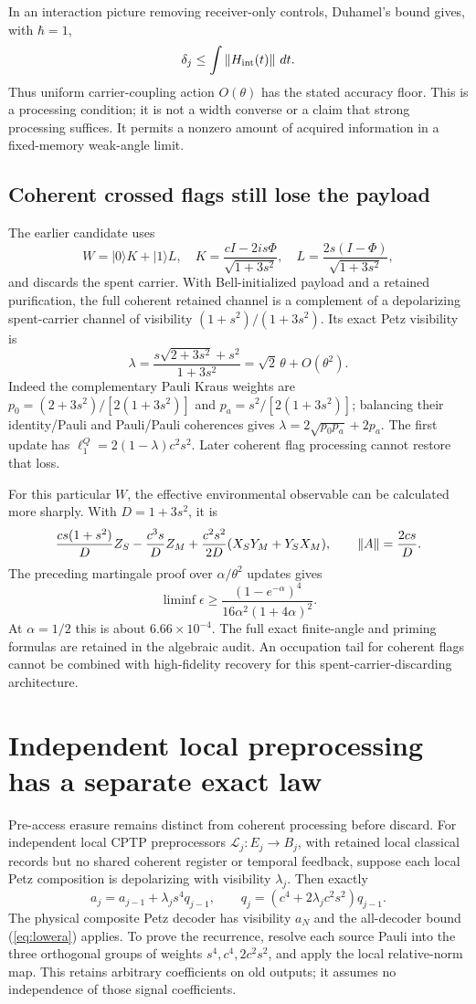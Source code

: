 In an interaction picture removing receiver-only controls, Duhamel's bound
gives, with $\hbar=1$,
\[
 \delta_j\le\int\left\lVert H_{\rm int}(t)\right\rVert\,dt.
\]
Thus uniform carrier-coupling action $O(\theta)$ has the stated accuracy
floor. This is a processing condition; it is not a width converse or a claim
that strong processing suffices. It permits a nonzero amount of acquired
information in a fixed-memory weak-angle limit.

\subsection{Coherent crossed flags still lose the payload}
The earlier candidate uses
\[
 W=|0\rangle K+|1\rangle L,\quad
 K=\frac{cI-2is\Phi}{\sqrt{1+3s^2}},\quad
 L=\frac{2s(I-\Phi)}{\sqrt{1+3s^2}},
\]
and discards the spent carrier. With Bell-initialized payload and a retained
purification, the full coherent retained channel is a complement of a
depolarizing spent-carrier channel of visibility $(1+s^2)/(1+3s^2)$.
Its exact Petz visibility is
\[
 \lambda=\frac{s\sqrt{2+3s^2}+s^2}{1+3s^2}
 =\sqrt2\,\theta+O(\theta^2).
\]
Indeed the complementary Pauli Kraus weights are
$p_0=(2+3s^2)/[2(1+3s^2)]$ and $p_a=s^2/[2(1+3s^2)]$; balancing their
identity/Pauli and Pauli/Pauli coherences gives
$\lambda=2\sqrt{p_0p_a}+2p_a$. The first update has
$\ell_1^Q=2(1-\lambda)c^2s^2$. Later coherent flag processing cannot restore
that loss.

For this particular $W$, the effective environmental observable can be
calculated more sharply. With $D=1+3s^2$, it is
\[
 \frac{cs(1+s^2)}D Z_S-\frac{c^3s}D Z_M
 +\frac{c^2s^2}{2D}(X_SY_M+Y_SX_M),
 \qquad\left\lVert A\right\rVert=\frac{2cs}D.
\]
The preceding martingale proof over $\alpha/\theta^2$ updates gives
\[
 \liminf\epsilon\ge
 \frac{(1-e^{-\alpha})^4}{16\alpha^2(1+4\alpha)^2}.
\]
At $\alpha=1/2$ this is about $6.66\times10^{-4}$. The full exact
finite-angle and priming formulas are retained in the algebraic audit.
An occupation tail for coherent flags cannot be combined with high-fidelity
recovery for this spent-carrier-discarding architecture.

\section{Independent local preprocessing has a separate exact law}
Pre-access erasure remains distinct from coherent processing before discard.
For independent local CPTP preprocessors $\mathcal L_j:E_j\to B_j$, with
retained local classical records but no shared coherent register or temporal
feedback, suppose each local Petz composition is depolarizing with visibility
$\lambda_j$. Then exactly
\[
 a_j=a_{j-1}+\lambda_js^4q_{j-1},\qquad
 q_j=(c^4+2\lambda_jc^2s^2)q_{j-1}.
\]
The physical composite Petz decoder has visibility $a_N$ and the all-decoder
bound (\ref{eq:lowera}) applies. To prove the recurrence, resolve each source
Pauli into the three orthogonal groups of weights $s^4,c^4,2c^2s^2$, and
apply the local relative-norm map. This retains arbitrary coefficients on old
outputs; it assumes no independence of those signal coefficients.

